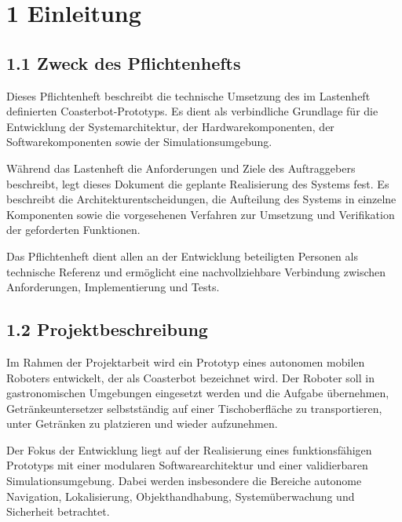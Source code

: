 \documentclass[
  a4paper,
  12pt,
  DIV=12,        %
  parskip=half,  %
  headings=small %
]{scrartcl}
\theoremstyle{definition}
\theoremstyle{definition}
\begin{document}
\newpage

\tableofcontents

\newpage

\section{1 Einleitung}\label{einleitung}

\subsection{1.1 Zweck des
Pflichtenhefts}\label{zweck-des-pflichtenhefts}

Dieses Pflichtenheft beschreibt die technische Umsetzung des im
Lastenheft definierten Coasterbot-Prototyps. Es dient als verbindliche
Grundlage für die Entwicklung der Systemarchitektur, der
Hardwarekomponenten, der Softwarekomponenten sowie der
Simulationsumgebung.

Während das Lastenheft die Anforderungen und Ziele des Auftraggebers
beschreibt, legt dieses Dokument die geplante Realisierung des Systems
fest. Es beschreibt die Architekturentscheidungen, die Aufteilung des
Systems in einzelne Komponenten sowie die vorgesehenen Verfahren zur
Umsetzung und Verifikation der geforderten Funktionen.

Das Pflichtenheft dient allen an der Entwicklung beteiligten Personen
als technische Referenz und ermöglicht eine nachvollziehbare Verbindung
zwischen Anforderungen, Implementierung und Tests.

\subsection{1.2 Projektbeschreibung}\label{projektbeschreibung}

Im Rahmen der Projektarbeit wird ein Prototyp eines autonomen mobilen
Roboters entwickelt, der als Coasterbot bezeichnet wird. Der Roboter
soll in gastronomischen Umgebungen eingesetzt werden und die Aufgabe
übernehmen, Getränkeuntersetzer selbstständig auf einer Tischoberfläche
zu transportieren, unter Getränken zu platzieren und wieder aufzunehmen.

Der Fokus der Entwicklung liegt auf der Realisierung eines
funktionsfähigen Prototyps mit einer modularen Softwarearchitektur und
einer validierbaren Simulationsumgebung. Dabei werden insbesondere die
Bereiche autonome Navigation, Lokalisierung, Objekthandhabung,
Systemüberwachung und Sicherheit betrachtet.
\end{document}
